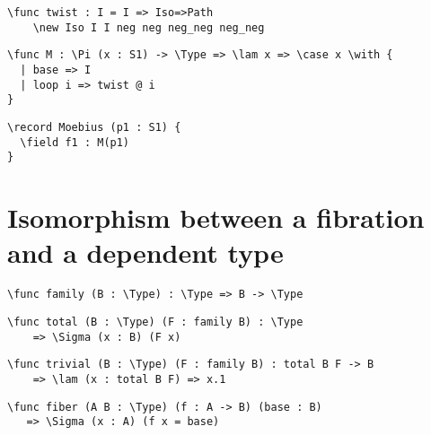 \begin{ListingEnv}[H]
\begin{lstlisting}
\func twist : I = I => Iso=>Path
    \new Iso I I neg neg neg_neg neg_neg
\end{lstlisting}
\end{ListingEnv}

\begin{ListingEnv}[H]
\begin{lstlisting}
\func M : \Pi (x : S1) -> \Type => \lam x => \case x \with {
  | base => I
  | loop i => twist @ i
}
\end{lstlisting}
\end{ListingEnv}

\begin{ListingEnv}[H]
\begin{lstlisting}
\record Moebius (p1 : S1) {
  \field f1 : M(p1)
}
\end{lstlisting}
\end{ListingEnv}

\section{Isomorphism between a fibration and a dependent type}

\begin{ListingEnv}[H]
\begin{lstlisting}
\func family (B : \Type) : \Type => B -> \Type
\end{lstlisting}
\end{ListingEnv}

\begin{ListingEnv}[H]
\begin{lstlisting}
\func total (B : \Type) (F : family B) : \Type 
	=> \Sigma (x : B) (F x)
\end{lstlisting}
\end{ListingEnv}

\begin{ListingEnv}[H]
\begin{lstlisting}
\func trivial (B : \Type) (F : family B) : total B F -> B 
	=> \lam (x : total B F) => x.1
\end{lstlisting}
\end{ListingEnv}

\begin{ListingEnv}[H]
\begin{lstlisting}
\func fiber (A B : \Type) (f : A -> B) (base : B)
   => \Sigma (x : A) (f x = base)
\end{lstlisting}
\end{ListingEnv}

